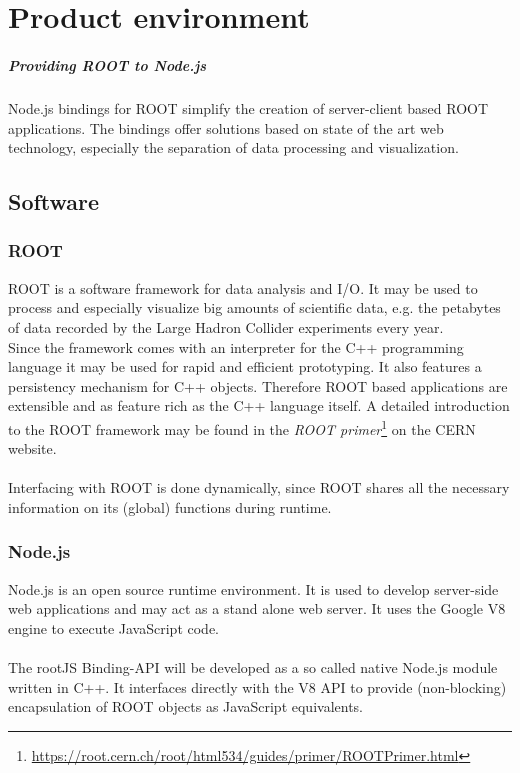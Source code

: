 \chapter{Product environment}

\paragraph{Providing ROOT to Node.js}
Node.js bindings for ROOT simplify the creation of server-client based ROOT applications. The bindings offer solutions based on state of the art web technology, especially the separation of data 
processing and visualization.\\

\section{Software}
\subsection{ROOT}

ROOT is a software framework for data analysis and I/O. It may be used to process and especially visualize big amounts of scientific data, e.g. the petabytes of data recorded by the Large Hadron Collider experiments every year.\\
Since the framework comes with an interpreter for the C++ programming language it may be used for rapid and efficient prototyping. It also features a persistency mechanism for C++ objects. Therefore ROOT based applications are extensible and as feature rich as the C++ language itself.
A detailed introduction to the ROOT framework may be found in the \textit{ROOT  primer}\footnote[1]{\url{https://root.cern.ch/root/html534/guides/primer/ROOTPrimer.html}}
on the CERN website. \\ \\
Interfacing with ROOT is done dynamically, since ROOT shares all the necessary information on its (global) functions during runtime.

\subsection{Node.js}

Node.js is an open source runtime environment. It is used to develop server-side web applications and may act as a stand alone web server. It uses the Google V8 engine to execute JavaScript code. \\ \\
The rootJS Binding-API will be developed as a so called native Node.js module written in C++. It interfaces directly with the V8 API to provide (non-blocking) encapsulation of ROOT objects as JavaScript equivalents.

